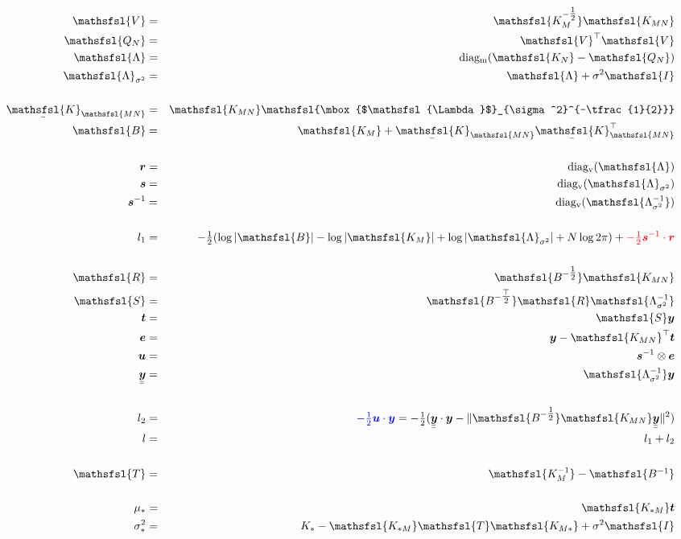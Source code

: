 \documentclass[12pt]{article}
\newcommand{\red}{\textcolor{red}}
\newcommand{\blue}{\textcolor{blue}}
\newcommand{\myu}[1]{\underaccent{\bar}{#1}}
\newcommand{\onehalf}{\tfrac{1}{2}}
\newcommand{\mat}[1]{\mbox{$\mathsfsl{#1}$}}
\newcommand{\myvec}[1]{\mbox{\boldmath$#1$}}
\newcommand{\diagv}[1]{\mathrm{diag_v}(#1)}
\newcommand{\diagm}[1]{\mathrm{diag_m}(#1)}
\newcommand{\transm}[1]{\mat{#1}^\top}
\newcommand{\imat}[1]{\mat{#1^{-1}}}
\newcommand{\ichol}[1]{\mat{#1^{-\onehalf}}}
\newcommand{\icholt}[1]{\mat{#1^{-\tfrac{\top}{2}}}}
\newcommand{\Km}{\mat{K_M}}
\newcommand{\Kmn}{\mat{K_{MN}}}
\newcommand{\Knm}{\transm{K_{MN}}}
\newcommand{\uKnm}{\myu{\mat{K}}_{\mathsfsl{MN}}^\top}
\newcommand{\uKmn}{\myu{\mat{K}}_{\mathsfsl{MN}}}
\newcommand{\vece}{\myvec{e}}
\newcommand{\vecr}{\myvec{r}}
\newcommand{\vecs}{\myvec{s}}
\newcommand{\vect}{\myvec{t}}
\newcommand{\vecu}{\myvec{u}}
\newcommand{\vecy}{\myvec{y}}
\newcommand{\uuvecy}{\myu{\myu{\vecy}}}
\newcommand{\vecis}{\myvec{s}^{-1}}
\newcommand{\matB}{\mat{B}}
\newcommand{\matI}{\mat{I}}
\newcommand{\matR}{\mat{R}}
\newcommand{\matS}{\mat{S}}
\newcommand{\matT}{\mat{T}}
\newcommand{\matV}{\mat{V}}
\newcommand{\Lam}{\mat{\Lambda}}
\newcommand{\Lamss}{\mat{\Lambda}_{\sigma^2}}
\newcommand{\Lamssi}{\imat{\Lambda_{\sigma^2}}}
\begin{document}
\begin{eqnarray*}
\matV & = & \ichol{K_M}\Kmn \\
\mat{Q_N} & = & \transm{V} \matV \\
\Lam & = & \diagm{\mat{K_N} - \mat{Q_N}} \\
\Lamss & = & \Lam + \sigma^2 \matI \\
\\
\uKmn & = & \Kmn \ichol{\Lamss} \\
\matB & = & \Km + \uKmn\uKnm \\
\\
\vecr & = & \diagv{\Lam} \\
\vecs & = & \diagv{\Lamss} \\
\vecis & = & \diagv{\Lamssi} \\
\\
l_1 & = & -\onehalf (\log|\matB| - \log|\Km| + \log|\Lamss| + N \log 2\pi) + \red{-\onehalf\vecis \cdot \vecr} \\
\\
\matR & = & \ichol{B}\Kmn \\
\matS & = & \icholt{B}\matR \Lamssi \\
\vect & = & \matS \vecy \\
\vece & = & \vecy - \Knm \vect \\
\vecu & = & \vecis \otimes \vece \\
\uuvecy & = & \Lamssi \vecy \\
\\
l_2 & = & \blue{-\onehalf \vecu\cdot\vecy} = -\onehalf(\uuvecy\cdot\vecy - \|\ichol{B}\Kmn\uuvecy\|^2) \\
l & = & l_1 + l_2 \\
\\
\matT & = & \imat{K_M} - \imat{B} \\
\\
\mu_* & = & \mat{K_{*M}} \vect \\
\sigma^2_* & = & K_* - \mat{K_{*M}}\matT\mat{K_{M*}} + \sigma^2 \matI \\
\end{eqnarray*}
\end{document}
